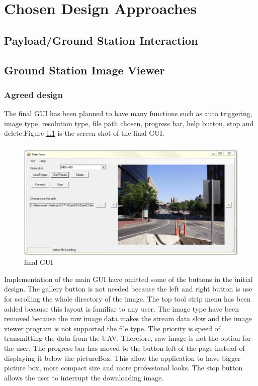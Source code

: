 \chapter{Chosen Design Approaches}




\section{Payload/Ground Station Interaction}

\section{Ground Station Image Viewer}
\subsection{Agreed design}

The final GUI has been planned to have many functions such as auto triggering, image type, resolution type, file path chosen, progress bar, help button, stop and delete.Figure \ref{finalGUI} is the screen shot of the final GUI.

\begin{figure}[!hbtp]
\begin{center}
\includegraphics[scale=0.5]{finalGUI.png} 
\end{center}
\caption{final GUI\label{finalGUI}}
\end{figure}
Implementation of the main GUI have omitted some of the buttons in the initial design. The gallery button is not needed because the left and right button is use for scrolling the whole directory of the image. The top tool strip menu has been added because this layout is familiar to any user. The image type have been removed because the raw image data makes the stream data slow and the image viewer program is not supported the file type. The priority is speed of transmitting the data from the UAV. Therefore, raw image is not the option for the user. The progress bar has moved to the button left of the page instead of displaying it below the pictureBox.
This allow the application to have bigger picture box, more compact size and more professional looks.
The stop button allows the user to interrupt the downloading image.
